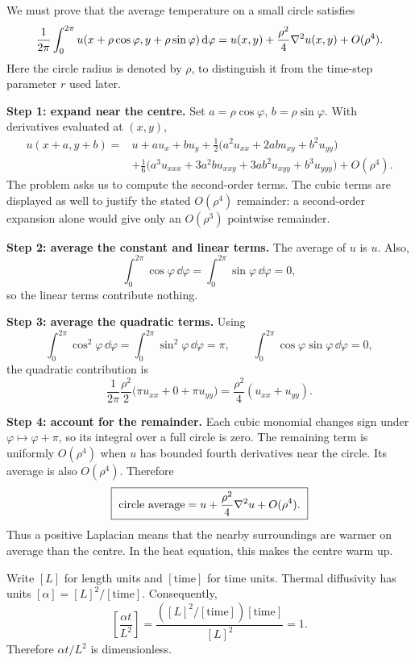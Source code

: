 We must prove that the average temperature on a small circle satisfies
\[
\frac{1}{2\pi}\int_0^{2\pi}u(x+\rho\cos\varphi,y+\rho\sin\varphi)\,\mathrm{d}\varphi
=u(x,y)+\frac{\rho^2}{4}\nabla^2 u(x,y)+O(\rho^4).
\]
Here the circle radius is denoted by $\rho$, to distinguish it from the time-step parameter $r$ used later.

\textbf{Step 1: expand near the centre.}
Set $a=\rho\cos\varphi$, $b=\rho\sin\varphi$. With derivatives evaluated at $(x,y)$,
\begin{align*}
u(x+a,y+b)={}&u+a u_x+b u_y
+\frac12\bigl(a^2u_{xx}+2ab u_{xy}+b^2u_{yy}\bigr)\\
&+\frac16\bigl(a^3u_{xxx}+3a^2b u_{xxy}+3ab^2u_{xyy}+b^3u_{yyy}\bigr)
+O(\rho^4).
\end{align*}
The problem asks us to compute the second-order terms. The cubic terms are displayed as well
to justify the stated $O(\rho^4)$ remainder: a second-order expansion alone would give only
an $O(\rho^3)$ pointwise remainder.

\textbf{Step 2: average the constant and linear terms.}
The average of $u$ is $u$. Also,
\[
\int_0^{2\pi}\cos\varphi\,\dd\varphi
=\int_0^{2\pi}\sin\varphi\,\dd\varphi=0,
\]
so the linear terms contribute nothing.

\textbf{Step 3: average the quadratic terms.}
Using
\[
\int_0^{2\pi}\cos^2\varphi\,\dd\varphi
=\int_0^{2\pi}\sin^2\varphi\,\dd\varphi=\pi,
\qquad \int_0^{2\pi}\cos\varphi\sin\varphi\,\dd\varphi=0,
\]
the quadratic contribution is
\[
\frac{1}{2\pi}\frac{\rho^2}{2}
\bigl(\pi u_{xx}+0+\pi u_{yy}\bigr)
=\frac{\rho^2}{4}(u_{xx}+u_{yy}).
\]

\textbf{Step 4: account for the remainder.}
Each cubic monomial changes sign under $\varphi\mapsto\varphi+\pi$, so its integral
over a full circle is zero. The remaining term is uniformly $O(\rho^4)$ when $u$ has bounded
fourth derivatives near the circle. Its average is also $O(\rho^4)$. Therefore
\[
\boxed{\ \text{circle average}=u+\frac{\rho^2}{4}\nabla^2 u+O(\rho^4).\ }
\]
Thus a positive Laplacian means that the nearby surroundings are warmer on average than the
centre. In the heat equation, this makes the centre warm up.

Write $[L]$ for length units and $[\mathrm{time}]$ for time units. Thermal diffusivity has units
$[\alpha]=[L]^2/[\mathrm{time}]$. Consequently,
\[
\left[\frac{\alpha t}{L^2}\right]
=\frac{([L]^2/[\mathrm{time}])[\mathrm{time}]}{[L]^2}=1.
\]
Therefore $\alpha t/L^2$ is dimensionless.

